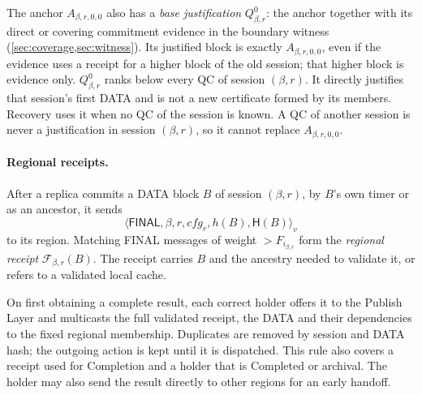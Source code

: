 \documentclass[11pt,a4paper]{article}
\newcommand{\FC}{\mathcal F}
\newcommand{\Hash}{\mathsf H}
\newcommand{\tagg}[1]{\ensuremath{\mathsf{#1}}}
\newcommand{\defterm}[1]{\textcolor{rrBlue}{\textit{#1}}}
\begin{document}
The anchor $A_{\beta,r,0,0}$ also has a \defterm{base justification}
$Q_{\beta,r}^0$: the anchor together with its direct or covering
commitment evidence in the boundary witness
(\cref{sec:coverage,sec:witness}). Its justified block is exactly
$A_{\beta,r,0,0}$, even if the evidence uses a receipt for a higher
block of the old session; that higher block is evidence only.
$Q_{\beta,r}^0$ ranks below every QC of session $(\beta,r)$.
It directly justifies that session's first DATA and is not a new
certificate formed by its members. Recovery uses it when no QC of the
session is known. A QC of another session is
never a justification in session $(\beta,r)$, so it cannot replace
$A_{\beta,r,0,0}$.

\paragraph{Regional receipts.}
After a replica commits a DATA block $B$ of session $(\beta,r)$, by $B$'s
own timer or as an ancestor, it sends
\[
 \langle\tagg{FINAL},\beta,r,\mathit{cfg}_r,h(B),\Hash(B)\rangle_v
\]
to its region. Matching FINAL messages of weight $>F_{i_{\beta,r}}$ form
the \defterm{regional receipt} $\FC_{\beta,r}(B)$. The receipt carries
$B$ and the ancestry needed to validate it, or refers to a validated
local cache.

On first obtaining a complete result, each correct holder offers it to
the Publish Layer and multicasts the full validated receipt, the DATA
and their dependencies to the fixed regional membership. Duplicates are
removed by session and DATA hash; the outgoing action is kept until it
is dispatched. This rule also covers a receipt used for Completion and
a holder that is Completed or archival. The holder may also send the
result directly to other regions for an early handoff.
\end{document}
